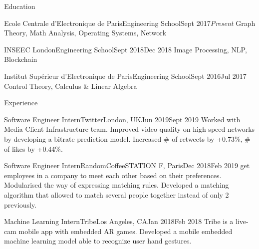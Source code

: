 \documentclass{resume} %
\begin{document}
	\begin{rSection}{Education}
		\begin{school}{Ecole Centrale d'Electronique de Paris}{Engineering School}{Sept 2017}{\em Present}{
			Graph Theory, Math Analysis, Operating Systems, Network
		}
		\end{school}

		\begin{school}{INSEEC London}{Engineering School}{Sept 2018}{Dec 2018}{
			Image Processing, NLP, Blockchain
		}
		\end{school}

		\begin{school}{Institut Supérieur d'Electronique de Paris}{Engineering School}{Sept 2016}{Jul 2017}{
			Control Theory, Calculus \& Linear Algebra
		}
		\end{school}
	\end{rSection}

	\begin{rSection}{Experience}
		\begin{job}{Software Engineer Intern}{Twitter}{London, UK}{Jun 2019}{Sept 2019}{
			Worked with Media Client Infrastructure team. Improved video quality on high speed networks by developing a bitrate prediction model. Increased \# of retweets by +0.73\%, \# of likes by +0.44\%.
		}
		\end{job}

		\begin{job}{Software Engineer Intern}{RandomCoffee}{STATION F, Paris}{Dec 2018}{Feb 2019}{
			 get employees in a company to meet each other based on their preferences. Modularised the way of expressing matching rules. Developed a matching algorithm that allowed to match several people together instead of only 2 previously.
		}
		\end{job}

		\begin{job}{Machine Learning Intern}{Tribe}{Los Angeles, CA}{Jan 2018}{Feb 2018}{
			Tribe is a live-cam mobile app with embedded AR games. Developed a mobile embedded machine learning model able to recognize user hand gestures.
		}
		\end{job}
	\end{rSection}
\end{document}
